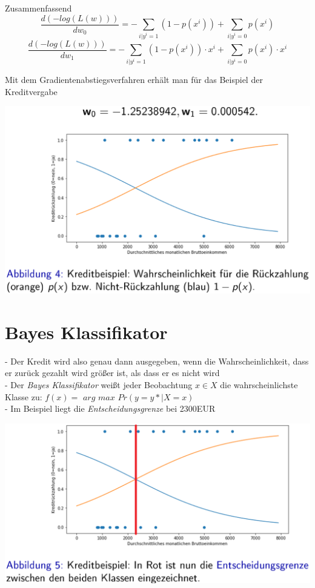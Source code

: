 \documentclass{report}
\begin{document}
  Zusammenfassend	
  $$\frac{d(-log(L(w)))}{dw_0} = -\sum_{i|y^i = 1}(1 - p(x^i)) + \sum_{i | y^i = 0}p(x^i)$$	
  $$\frac{d(-log(L(w)))}{dw_1} = -\sum_{i|y^i = 1}(1 - p(x^i))\cdot x^i + \sum_{i|y^i = 0}p(x^i)\cdot x^i$$	
  
  Mit dem Gradientenabstiegsverfahren erhält man für das Beispiel der Kreditvergabe	
  \begin{center}	
    \includegraphics[scale=.25]{ml03_3}	
  \end{center}	
  
  \section{Bayes Klassifikator}	
  - Der Kredit wird also genau dann ausgegeben, wenn die Wahrscheinlichkeit, dass er zurück gezahlt wird größer ist, als dass er es nicht wird\\	
  - Der \textit{Bayes Klassifikator} weißt jeder Beobachtung $x \in X$ die wahrscheinlichste Klasse zu: $f(x) =$ $arg$ $max$ $Pr(y = y* | X = x)$\\	
  - Im Beispiel liegt die \textit{Entscheidungsgrenze} bei 2300EUR	
  \begin{center}	
    \includegraphics[scale=.25]{ml03_4}	
  \end{center}	
  
\end{document}
